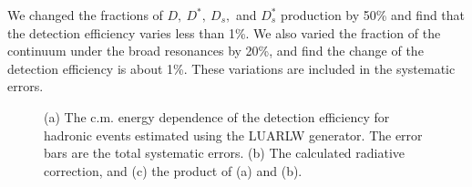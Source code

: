 We changed the %
fractions of $D,~D^*,~D_s,$ and $D_s^*$ production by 50\% and find that 
the detection efficiency varies less than 1\%.  We also varied 
the fraction of the continuum under the broad resonances by 20\%, and find
the change of the detection efficiency is about 1\%. These 
variations are included in the systematic errors. 

\begin{figure}[htb]
\epsfysize=2.7in
\centerline{}
\caption{(a) The c.m. energy dependence of the detection efficiency
for hadronic events estimated using the LUARLW generator. The error 
bars are the total systematic errors. 
(b) The calculated radiative correction, and
(c) the product of (a) and (b).}
\label{fig:eff_isr99}
\end{figure}

%

